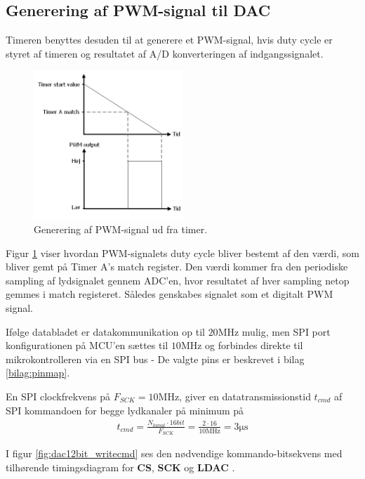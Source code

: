 \subsection{Generering af PWM-signal til DAC}
Timeren benyttes desuden til at generere et PWM-signal, hvis duty cycle er styret af timeren og resultatet af A/D konverteringen af indgangssignalet. 
\begin{figure}
	\centering
	\includegraphics[width=0.5\textwidth]{billeder/timer3PWM.png}
	\caption{\label{fig:PWMfromtimer}Generering af PWM-signal ud fra timer. }
\end{figure}
Figur \ref{fig:PWMfromtimer} viser hvordan PWM-signalets duty cycle bliver bestemt af den værdi, som bliver gemt på Timer A's match register. 
Den værdi kommer fra den periodiske sampling af lydsignalet gennem ADC'en, hvor resultatet af hver sampling netop gemmes i match registeret. 
Således genskabes signalet som et digitalt PWM signal. 

Ifølge databladet er datakommunikation op til $20\si{\mega\hertz}$ mulig, men SPI port konfigurationen på MCU'en sættes til $10\si{\mega\hertz}$ og forbindes direkte til mikrokontrolleren via en SPI bus - De valgte pins er beskrevet i bilag \ref{bilag:pinmap}.

En SPI clockfrekvens på $F_{SCK} = 10\si{\mega\hertz}$, giver en datatransmissionstid $t_{cmd}$ af SPI kommandoen for begge lydkanaler på minimum på 
\begin{align}
t_{cmd} = \frac{N_{kanal} \cdot 16bit}{F_{SCK}} = \frac{2 \cdot 16}{10\si{\mega\hertz}} = 3\si{\micro\second}
\end{align}

I figur \ref{fig:dac12bit_writecmd} ses den nødvendige kommando-bitsekvens med tilhørende timingsdiagram for \textbf{CS}, \textbf{SCK} og \textbf{LDAC}  .\\

